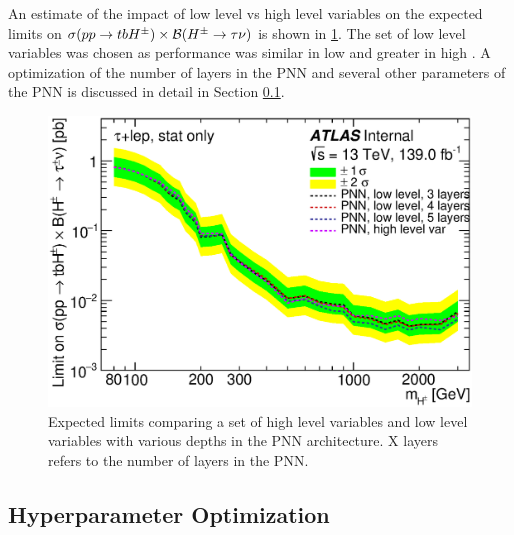       An estimate of the impact of low level vs high level variables on the expected limits on $\sigma(pp\to tbH^{\pm})\times \mathrm{\cal{B}}(H^{\pm} \to \tau \nu)$ is shown in \ref{fig:variable-comparison-limits}. The set of low level variables was chosen as performance was similar in low \mHpm and greater in high \mHpm. A optimization of the number of layers in the PNN and several other parameters of the PNN is discussed in detail in Section \ref{ssec:hpo}.
			\begin{figure}	
				\begin{center}
					\includegraphics[width=.75\textwidth,keepaspectratio=true]{chapters/chapter6_HPlus/images/taulep_limits_PNN_low_lv_vs_high_lv.eps}
				\end{center}
				\caption{Expected limits comparing a set of high level variables and low level variables with various depths in the PNN architecture. X layers refers to the number of layers in the PNN. }
				\label{fig:variable-comparison-limits}
			\end{figure}	

		\subsection{Hyperparameter Optimization}\label{ssec:hpo}

